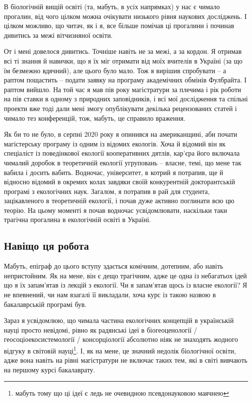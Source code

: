 \documentclass[
  11pt,
]{book}
\begin{document}
В біологічній вищій освіті (та, мабуть, в усіх напрямках) у нас є чимало прогалин, від чого цілком можна очікувати низького рівня наукових досліджень. І цілком можливо, що читач, як і я, все більше помічав ці прогалини і починав дивитись за межі вітчизняної освіти.

От і мені довелося дивитись. Точніше навіть не за межі, а за кордон. Я отримав всі ті знання й навички, що я їх міг отримати від моїх вчителів в Україні (за що їм безмежно вдячний), але цього було мало. Тож я вирішив спробувати -- а раптом пощастить -- подати заявку на програму академічних обмінів Фулбрайта. І раптом вийшло. На той час я мав пів року магістратури за плечима і рік роботи на пів ставки в одному з природних заповідників, і всі мої дослідження та спільні проекти вже тоді дали мені змогу опублікувати декілька рецензованих статей і чимало тез конференцій, тож, мабуть, це справило враження.

Як би то не було, в серпні 2020 року я опинився на американщині, аби почати магістерську програму із одним із відомих екологів. Хоча й відомий він як спеціаліст із поведінкової екології кооперативних дятлів, кар'єра його включала чималий доробок в теоретичній екології угруповань -- власне, темі, що мене так вабила і досить вабить. Водночас, університет, в котрий я потрапив, ще й відносно відомий в окремих колах завдяки своїй конкурентній докторантській програмі з екологічних наук. Загалом, я потрапив в рай для студента, зацікавленого в теоретичній екології, і почав дуже активно поглинати всю цю теорію. На цьому моменті я почав водночас усвідомлювати, наскільки таки трагічна прогалина в екологічній освіті в Україні.

\subsection{Навіщо ця робота}\label{whythiswork}

Мабуть, епіграф до цього вступу здається комічним, дотепним, або навіть непристойним. Як на мене, він є дещо трагічним, адже це одна із небагатьох ідей що я їх запам'ятав із лекцій з екології. Чи я запам'ятав щось із власне екології? Я не впевнений, чи нам взагалі її викладали, хоча курс із такою назвою в бакалаврській програмі був.

Зараз я усвідомлюю, що чимала частина екологічних концепцій в українській науці просто невідомі, рівно як радянські ідеї в біогеоценології / геосоціоекосистемології / консорціології абсолютно ніяк не знаходять жодного відгуку в світовій науці\footnote{мабуть тому що ці ідеї є ледь не очевидною псевдонауковою маячнею}. І, як на мене, це значний недолік біологічної освіти, адже вона навіть на рівні магістратури не включає таких тем, які в світі вивчають на першому курсі бакалаврату.
\end{document}
